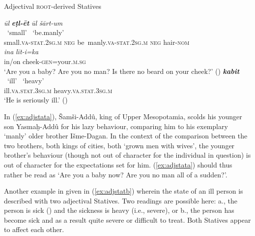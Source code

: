 \documentclass[output=paper,colorlinks,citecolor=brown]{langscibook}
\begin{document}
\begin{exe}  \ex Adjectival \textsc{root}-derived Statives \label{ex:adjstat}
    \begin{xlist}
        \ex \label{ex:adjstata}  \textit{ūl} {\textit{\textbf{eṭl-ēt}} } \textit{ūl} \textit{šārt-um} \\ 
        ~`small' {} ~`{be.manly}' {} {} \\
     small.\textsc{va-stat.2sg.m} \textsc{neg} be~manly.\textsc{va-stat.2sg.m} \textsc{neg} hair-\textsc{nom}\\
     \gll \textit{ina} \textit{līt-i=ka}\\ in/on
     cheek-\textsc{gen=}your.\textsc{m.sg}\\
    \glt `Are you a baby? Are you no man? Is there no beard on your cheek?' ()
    \ex \label{ex:adjstatb}  {\textit{\textbf{kabit}} }\\
    ~`ill' ~`heavy' \\
     ill.\textsc{va}.\textsc{stat.3sg.m} heavy.\textsc{va}.\textsc{stat.3sg.m}\\
    \glt `He is seriously ill.' (\citealt[68, No.43:16]{Goetze1958})
    \end{xlist} 
\end{exe}

 In (\ref{ex:adjstata}), Šamši-Addû, king of Upper Mesopotamia, scolds his younger son Yasmaḫ-Addû for his lazy behaviour, comparing him to his exemplary `manly' older brother Išme-Dagan. In the context of the comparison between the two brothers, both kings of cities, both `grown men with wives', the younger brother's behaviour (though not out of character for the individual in question) is out of character for the expectations set for him. (\ref{ex:adjstata}) should thus rather be read as `Are you a baby now? Are you no man all of a sudden?'.

Another example in given in (\ref{ex:adjstatb}) wherein the state of an ill person is described with two adjectival Statives. Two readings are possible here: a., the person is sick () and the sickness is heavy (i.e., severe), or b., the person has become sick and as a result quite severe or difficult to treat. Both Statives appear to affect each other.
\end{document}
